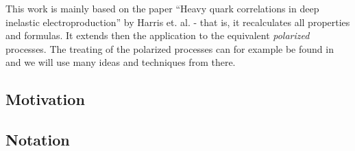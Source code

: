 This work is mainly based on the paper \enquote{Heavy quark correlations in deep inelastic electroproduction} by Harris et. al.\cite{Harris:1995tu} - that is, it recalculates all properties and formulas. It extends then the application to the equivalent \textit{polarized} processes. The treating of the polarized processes can for example be found in \cite{Bojak:2000eu,epub29831} and we will use many ideas and techniques from there.

\subsection{Motivation}

\subsection{Notation}

